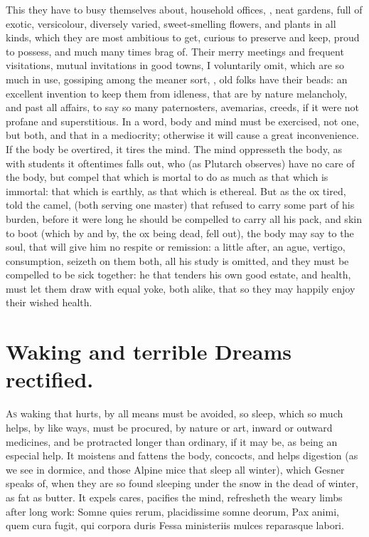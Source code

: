 {This they have to busy themselves about, household offices, \etc{}, 
neat gardens, full of exotic, versicolour, diversely varied,
sweet-smelling flowers, and plants in all kinds, which they are most
ambitious to get, curious to preserve and keep, proud to possess, and
much many times brag of. Their merry meetings and frequent visitations,
mutual invitations in good towns, I voluntarily omit, which are so much
in use, gossiping among the meaner sort, \etc{}, old folks have their
beads: an excellent invention to keep them from idleness, that are by
nature melancholy, and past all affairs, to say so many paternosters,
avemarias, creeds, if it were not profane and superstitious. In a word,
body and mind must be exercised, not one, but both, and that in a
mediocrity; otherwise it will cause a great inconvenience. If the body
be overtired, it tires the mind. The mind oppresseth the body, as with
students it oftentimes falls out, who (as Plutarch observes) have
no care of the body, but compel that which is mortal to do as much as
that which is immortal: that which is earthly, as that which is
ethereal. But as the ox tired, told the camel, (both serving one
master) that refused to carry some part of his burden, before it were
long he should be compelled to carry all his pack, and skin to boot
(which by and by, the ox being dead, fell out), the body may say to the
soul, that will give him no respite or remission: a little after, an
ague, vertigo, consumption, seizeth on them both, all his study is
omitted, and they must be compelled to be sick together: he that
tenders his own good estate, and health, must let them draw with equal
yoke, both alike,  that so they may happily enjoy their wished
health.


\section{Waking and terrible Dreams rectified.}

\lettrine{A}{s} waking that hurts, by all means must be avoided, so sleep, which so
much helps, by like ways, must be procured, by nature or art,
inward or outward medicines, and be protracted longer than ordinary, if
it may be, as being an especial help. It moistens and fattens the body,
concocts, and helps digestion (as we see in dormice, and those Alpine
mice that sleep all winter), which Gesner speaks of, when they are so
found sleeping under the snow in the dead of winter, as fat as butter.
It expels cares, pacifies the mind, refresheth the weary limbs after
long work:
Somne quies rerum, placidissime somne deorum, Pax animi, quem
cura fugit, qui corpora duris
Fessa ministeriis mulces reparasque labori.

}
